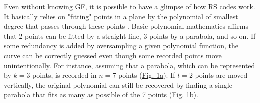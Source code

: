 \documentclass[conference]{IEEEtran}
\begin{document}
\par Even without knowing GF, it is possible to have a glimpse of how RS codes work. It basically relies on "fitting" points in a plane by the polynomial of smallest degree that passes through these points \cite{b6}. Basic polynomial mathematics affirms that 2 points can be fitted by a straight line, 3 points by a parabola, and so on. If some redundancy is added by oversampling a given polynomial function, the curve can be correctly guessed even though some recorded points move unintentionally. For instance, assuming that a parabola, which can be represented by $k = 3$ points, is recorded in $n = 7$ points (\hyperref[fig:fig1a]{Fig. 1a}). If $t = 2$ points are moved vertically, the original polynomial can still be recovered by finding a single parabola that fits as many as possible of the 7 points (\hyperref[fig:fig1b]{Fig. 1b}). 

\end{document}
